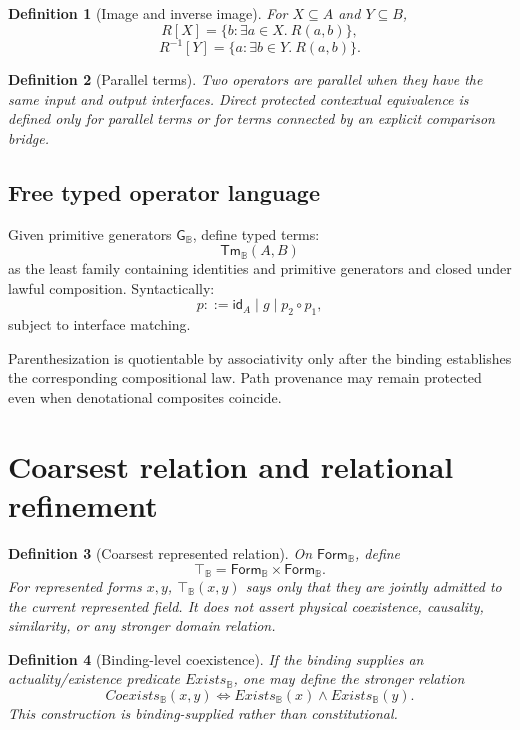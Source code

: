 \documentclass[11pt,oneside]{article}
\newtheorem{definition}{Definition}[section]
\newcommand{\B}{\mathbb B}
\begin{document}
\begin{definition}[Image and inverse image]
For \(X\subseteq A\) and \(Y\subseteq B\),
\[
R[X]=\{b:\exists a\in X.\ R(a,b)\},
\]
\[
R^{-1}[Y]=\{a:\exists b\in Y.\ R(a,b)\}.
\]
\end{definition}

\begin{definition}[Parallel terms]
Two operators are parallel when they have the same input and output interfaces.  Direct protected contextual equivalence is defined only for parallel terms or for terms connected by an explicit comparison bridge.
\end{definition}

\subsection{Free typed operator language}

Given primitive generators \(\mathsf G_{\B}\), define typed terms:
\[
\mathsf{Tm}_{\B}(A,B)
\]
as the least family containing identities and primitive generators and closed under lawful composition.  Syntactically:
\[
p ::= \mathsf{id}_A \mid g \mid p_2\circ p_1,
\]
subject to interface matching.

Parenthesization is quotientable by associativity only after the binding establishes the corresponding compositional law.  Path provenance may remain protected even when denotational composites coincide.


\section{Coarsest relation and relational refinement}

\begin{definition}[Coarsest represented relation]
On \(\mathsf{Form}_{\B}\), define
\[
\boxed{
\top_{\B}
=
\mathsf{Form}_{\B}\times\mathsf{Form}_{\B}.
}
\]
For represented forms \(x,y\), \(\top_{\B}(x,y)\) says only that they are jointly admitted to the current represented field.  It does not assert physical coexistence, causality, similarity, or any stronger domain relation.
\end{definition}

\begin{definition}[Binding-level coexistence]
If the binding supplies an actuality/existence predicate \(Exists_{\B}\), one may define the stronger relation
\[
Coexists_{\B}(x,y)
\iff
Exists_{\B}(x)\land Exists_{\B}(y).
\]
This construction is binding-supplied rather than constitutional.
\end{definition}
\end{document}

